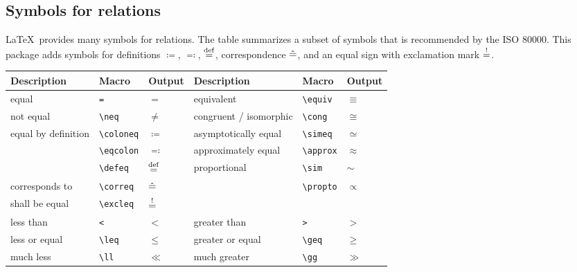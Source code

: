 \documentclass[DIV=13]{scrartcl}
\begin{document}
\subsection{Symbols for relations}
\LaTeX\ provides many symbols for relations. The table summarizes a subset
of symbols that is recommended by the ISO \num{80000}.
This package adds symbols for definitions $\coloneq$, $\eqcolon$, $\stackrel{\mathrm{def}}{=}$,
correspondence $\mathrel{\hat{=}}$, and an equal sign with exclamation mark $\stackrel{!}{=}$.
\begin{center}
  \begin{tabular}{lll|lll}
    \toprule
    \textbf{Description}   & \textbf{Macro}   & \textbf{Output} &
    \textbf{Description}   & \textbf{Macro}   & \textbf{Output} \\
    \midrule
    equal                  & \verb|=|         & $=$             &
    equivalent             & \verb|\equiv|    & $\equiv$        \\
    not equal              & \verb|\neq|      & $\neq$          &
    congruent / isomorphic & \verb|\cong|     & $\cong$         \\
    equal by definition    & \verb|\coloneq|  & $\coloneq$      &
    asymptotically equal   & \verb|\simeq|    & $\simeq$        \\
                           & \verb|\eqcolon|  & $\eqcolon$      &
    approximately equal    & \verb|\approx|   & $\approx$       \\
                           & \verb|\defeq|    & $\stackrel{\mathrm{def}}{=}$        &
    proportional           & \verb|\sim|      & $\sim$          \\
    corresponds to         & \verb|\correq|   & $\mathrel{\hat{=}}$       &
                           & \verb|\propto|   & $\propto$       \\
    shall be equal         & \verb|\excleq|   & $\stackrel{!}{=}$       \\
    \midrule
    less than              & \verb|<|         & $<$             &
    greater than           & \verb|>|         & $>$             \\
    less or equal          & \verb|\leq|      & $\leq$          &
    greater or equal       & \verb|\geq|      & $\geq$          \\
    much less              & \verb|\ll|       & $\ll$           &
    much greater           & \verb|\gg|       & $\gg$           \\
    \bottomrule
  \end{tabular}
\end{center}
\end{document}
